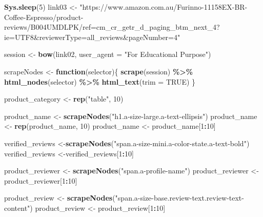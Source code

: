 \documentclass[
]{article}
\newenvironment{Shaded}{\begin{snugshade}}{\end{snugshade}}
\newcommand{\AttributeTok}[1]{\textcolor[rgb]{0.13,0.29,0.53}{#1}}
\newcommand{\ConstantTok}[1]{\textcolor[rgb]{0.56,0.35,0.01}{#1}}
\newcommand{\ControlFlowTok}[1]{\textcolor[rgb]{0.13,0.29,0.53}{\textbf{#1}}}
\newcommand{\DecValTok}[1]{\textcolor[rgb]{0.00,0.00,0.81}{#1}}
\newcommand{\FunctionTok}[1]{\textcolor[rgb]{0.13,0.29,0.53}{\textbf{#1}}}
\newcommand{\NormalTok}[1]{#1}
\newcommand{\OtherTok}[1]{\textcolor[rgb]{0.56,0.35,0.01}{#1}}
\newcommand{\SpecialCharTok}[1]{\textcolor[rgb]{0.81,0.36,0.00}{\textbf{#1}}}
\newcommand{\StringTok}[1]{\textcolor[rgb]{0.31,0.60,0.02}{#1}}
\begin{document}
\begin{Shaded}
\begin{Highlighting}[]
   \FunctionTok{Sys.sleep}\NormalTok{(}\DecValTok{5}\NormalTok{)}
\NormalTok{link03 }\OtherTok{\textless{}{-}} \StringTok{"https://www.amazon.com.au/Furinno{-}11158EX{-}BR{-}Coffee{-}Espresso/product{-}reviews/B004UMDLPK/ref=cm\_cr\_getr\_d\_paging\_btm\_next\_4?ie=UTF8\&reviewerType=all\_reviews\&pageNumber=4"}


\NormalTok{  session }\OtherTok{\textless{}{-}} \FunctionTok{bow}\NormalTok{(link02,}
               \AttributeTok{user\_agent =} \StringTok{"For Educational Purpose"}\NormalTok{)}

\NormalTok{  scrapeNodes }\OtherTok{\textless{}{-}} \ControlFlowTok{function}\NormalTok{(selector)\{}
    \FunctionTok{scrape}\NormalTok{(session) }\SpecialCharTok{\%\textgreater{}\%}
      \FunctionTok{html\_nodes}\NormalTok{(selector) }\SpecialCharTok{\%\textgreater{}\%}
      \FunctionTok{html\_text}\NormalTok{(}\AttributeTok{trim =} \ConstantTok{TRUE}\NormalTok{)}
\NormalTok{  \}}

\NormalTok{  product\_category }\OtherTok{\textless{}{-}} \FunctionTok{rep}\NormalTok{(}\StringTok{"table"}\NormalTok{, }\DecValTok{10}\NormalTok{)}

\NormalTok{  product\_name }\OtherTok{\textless{}{-}} \FunctionTok{scrapeNodes}\NormalTok{(}\StringTok{"h1.a{-}size{-}large.a{-}text{-}ellipsis"}\NormalTok{)}
\NormalTok{  product\_name }\OtherTok{\textless{}{-}} \FunctionTok{rep}\NormalTok{(product\_name, }\DecValTok{10}\NormalTok{)}
\NormalTok{  product\_name }\OtherTok{\textless{}{-}}\NormalTok{ product\_name[}\DecValTok{1}\SpecialCharTok{:}\DecValTok{10}\NormalTok{]}
  
\NormalTok{  verified\_reviews }\OtherTok{\textless{}{-}}\FunctionTok{scrapeNodes}\NormalTok{(}\StringTok{"span.a{-}size{-}mini.a{-}color{-}state.a{-}text{-}bold"}\NormalTok{)}
\NormalTok{  verified\_reviews }\OtherTok{\textless{}{-}}\NormalTok{verified\_reviews[}\DecValTok{1}\SpecialCharTok{:}\DecValTok{10}\NormalTok{]}
  
\NormalTok{  product\_reviewer }\OtherTok{\textless{}{-}} \FunctionTok{scrapeNodes}\NormalTok{(}\StringTok{"span.a{-}profile{-}name"}\NormalTok{)}
\NormalTok{  product\_reviewer }\OtherTok{\textless{}{-}}\NormalTok{ product\_reviewer[}\DecValTok{1}\SpecialCharTok{:}\DecValTok{10}\NormalTok{]}
  
\NormalTok{  product\_review }\OtherTok{\textless{}{-}} \FunctionTok{scrapeNodes}\NormalTok{(}\StringTok{"span.a{-}size{-}base.review{-}text.review{-}text{-}content"}\NormalTok{)}
\NormalTok{  product\_review }\OtherTok{\textless{}{-}}\NormalTok{ product\_review[}\DecValTok{1}\SpecialCharTok{:}\DecValTok{10}\NormalTok{]}
  

\end{Highlighting}
\end{Shaded}
\end{document}
